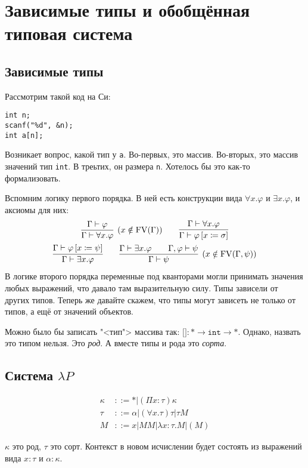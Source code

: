 \section{\texorpdfstring{Зависимые типы и обобщённая типовая система}{Dependent types and generalized type systems}}

\subsection{\texorpdfstring{Зависимые типы}{Dependent types}}

Рассмотрим такой код на Си:
\begin{verbatim}
int n;
scanf("%d", &n);
int a[n];
\end{verbatim}
Возникает вопрос, какой тип у \texttt{a}.
Во-первых, это массив. Во-вторых, это массив значений тип \texttt{int}. В треьтих, он размера \texttt{n}.
Хотелось бы это как-то формализовать.

\begin{@empty}
Вспомним логику первого порядка.
В ней есть конструкции вида $\forall x . \varphi$ и $\exists x . \varphi$, и аксиомы для них: %
\inferspacing
\begin{gather*}
    \infer[(x \notin \FV(\Gamma))]{\Gamma \vdash \forall x . \varphi}{\Gamma \vdash \varphi} \qquad
    \infer{\Gamma \vdash \varphi \left[x \coloneqq \sigma\right]}{\Gamma \vdash \forall x . \varphi} \\
    \infer{\Gamma \vdash \exists x . \varphi}{\Gamma \vdash \varphi \left[x \coloneqq \psi\right]} \qquad
    \infer[(x \notin \FV(\Gamma, \psi))]{\Gamma \vdash \psi}{\Gamma \vdash \exists x . \varphi && \Gamma, \varphi \vdash \psi}
\end{gather*}
В логике второго порядка переменные под кванторами могли принимать значения любых выражений, что давало там выразительную силу.
Типы зависели от других типов.
Теперь же давайте скажем, что типы могут зависеть не только от типов, а ещё от значений объектов.
\end{@empty}

Можно было бы записать "<тип"> массива так: $\texttt{[]}: * \rightarrow \mathtt{int} \rightarrow *$.
Однако, назвать это типом нельзя. Это \emph{род}. А вместе типы и рода это \emph{сорта}.

\subsection*{\texorpdfstring{Система $\lambda P$}{Lambda P}}
\begin{definition}
\begin{bnf}
\begin{align*}
    \kappa &::= * | (\Pi x : \tau) \kappa \\
    \tau   &::= \alpha | (\forall x . \tau) \tau | \tau M \\
    M      &::= x | MM | \lambda x : \tau . M | (M)
\end{align*}
\end{bnf}%
$\kappa$ это род, $\tau$ это сорт.
Контекст в новом исчислении будет состоять из выражений вида $x : \tau$ и $\alpha : \kappa$.
\end{definition}

